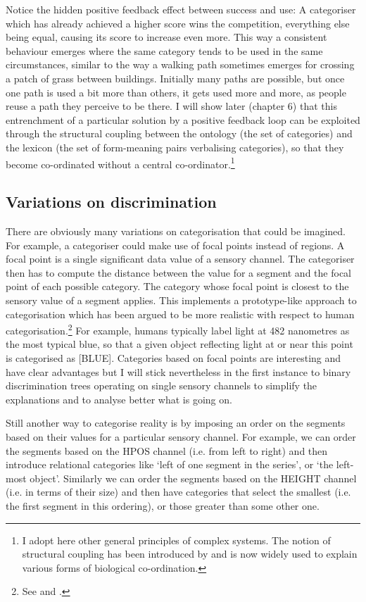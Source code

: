 Notice the hidden positive feedback effect between success
and use: A categoriser which has already achieved
a higher score wins the competition, everything else being
equal, causing its score to increase even more. 
This way a consistent behaviour emerges where the 
same category tends to be used in the same circumstances, 
similar to the way a walking path sometimes 
emerges for crossing a patch of grass between buildings. 
Initially many paths are possible, but once one path 
is used a bit more than others, it gets used more and 
more, as people reuse a path they perceive to be
there. I will show later (chapter 6) that this entrenchment of 
a particular solution by a positive feedback loop can 
be exploited through the structural coupling between 
the ontology (the set of categories) and the lexicon
(the set of form-meaning pairs verbalising categories), 
so that they become co-ordinated without a central 
co-ordinator.\footnote{
I adopt here other general principles of complex
systems. The notion of structural coupling has been 
introduced by \cite{Maturana:1992} and is 
now widely used to explain various forms of 
biological co-ordination.}

\subsection{Variations on discrimination}

There are obviously many variations on categorisation
that could be imagined. For example, a categoriser
could make use of focal points instead of regions. A focal 
point is a single significant data value of a sensory channel.
The categoriser then has to compute the distance 
between the value for a segment and the focal point 
of each possible category. The category 
whose focal point is closest to the sensory value
of a segment applies. This implements a prototype-like
approach to categorisation which has been argued to 
be more realistic with respect to human categorisation.\footnote{
See \cite{Varela:1991} and \cite{Taylor:1989}.}
For example, humans typically label light
at 482 nanometres as the most typical blue, so that a given object
reflecting light at or near this point is categorised
as [BLUE]. Categories based on focal points are 
interesting and have clear advantages 
but I will stick nevertheless in the first instance 
to binary discrimination trees operating on single sensory 
channels to simplify the explanations
and to analyse better what is going on. 

Still another way to categorise reality is by imposing 
an order on the segments based on their values for 
a particular sensory channel. For example, we can 
order the segments based on the HPOS channel (i.e. 
from left to right) and then introduce relational categories
like `left of one segment in the series', or `the left-most object'. 
Similarly we can order the segments based on the 
HEIGHT channel (i.e. in terms of their size) and then 
have categories that select the smallest (i.e. the 
first segment in this ordering), or those greater than 
some other one. 

